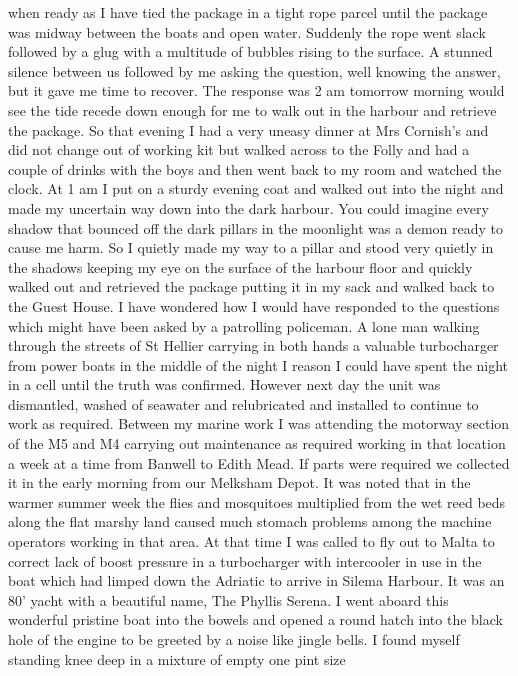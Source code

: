 when ready as I have tied the package in a tight rope parcel until the package
was midway between the boats and open water. Suddenly the rope went slack
followed by a glug with a multitude of bubbles rising to the surface. A stunned
silence between us followed by me asking the question, well knowing the answer,
but it gave me time to recover. The response was 2 am tomorrow morning would
see the tide recede down enough for me to walk out in the harbour and retrieve
the package. So that evening I had a very uneasy dinner at Mrs Cornish's and
did not change out of working kit but walked across to the Folly and had a
couple of drinks with the boys and then went back to my room and watched the
clock. At 1 am I put on a sturdy evening coat and walked out into the night and
made my uncertain way down into the dark harbour. You could imagine every
shadow that bounced off the dark pillars in the moonlight was a demon ready to
cause me harm. So I quietly made my way to a pillar and stood very quietly in
the shadows keeping my eye on the surface of the harbour floor and quickly
walked out and retrieved the package putting it in my sack and walked back to
the Guest House. I have wondered how I would have responded to the questions
which might have been asked by a patrolling policeman. A lone man walking
through the streets of St Hellier carrying in both hands a valuable
turbocharger from power boats in the middle of the night I reason I could have
spent the night in a cell until the truth was confirmed. However next day the
unit was dismantled, washed of seawater and relubricated and installed to
continue to work as required. Between my marine work I was attending
the motorway section of the M5 and M4 carrying out maintenance as required
working in that location a week at a time from Banwell to Edith Mead. If parts
were required we collected it in the early morning from our Melksham Depot. It
was noted that in the warmer summer week the flies and mosquitoes multiplied
from the wet reed beds along the flat marshy land caused much stomach problems
among the machine operators working in that area. At that time I was called to
fly out to Malta to correct lack of boost pressure in a turbocharger with
intercooler in use in the boat which had limped down the Adriatic to arrive in
Silema Harbour. It was an 80' yacht with a beautiful name, The Phyllis Serena.
I went aboard this wonderful pristine boat into the bowels and opened a round
hatch into the black hole of the engine to be greeted by a noise like jingle
bells. I found myself standing knee deep in a mixture of empty one pint size

